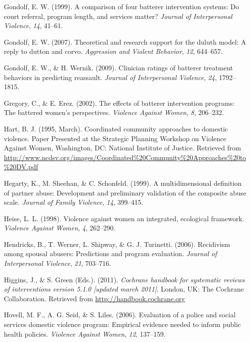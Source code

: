 \documentclass[11pt,]{tufte-book}
\begin{document}
\hypertarget{ref-gondolf1999comparison}{}
Gondolf, E. W. (1999). A comparison of four batterer intervention
systems: Do court referral, program length, and services matter?
\emph{Journal of Interpersonal Violence}, \emph{14}, 41--61.

\hypertarget{ref-gondolf2007theoretical}{}
Gondolf, E. W. (2007). Theoretical and research support for the duluth
model: A reply to dutton and corvo. \emph{Aggression and Violent
Behavior}, \emph{12}, 644--657.

\hypertarget{ref-gondolf2009clinician}{}
Gondolf, E. W., \& H. Wernik. (2009). Clinician ratings of batterer
treatment behaviors in predicting reassault. \emph{Journal of
Interpersonal Violence}, \emph{24}, 1792--1815.

\hypertarget{ref-gregory2002effects}{}
Gregory, C., \& E. Erez. (2002). The effects of batterer intervention
programs: The battered women's perspectives. \emph{Violence Against
Women}, \emph{8}, 206--232.

\hypertarget{ref-hart1995coordinated}{}
Hart, B. J. (1995, March). Coordinated community approaches to domestic
violence. Paper Presented at the Strategic Planning Workshop on Violence
Against Women, Washington, DC: National Institute of Justice. Retrieved
from
\url{http://www.ncdsv.org/images/Coordinated\%20Community\%20Approaches\%20to\%20DV.pdf}

\hypertarget{ref-hegarty1999multidimensional}{}
Hegarty, K., M. Sheehan, \& C. Schonfeld. (1999). A multidimensional
definition of partner abuse: Development and preliminary validation of
the composite abuse scale. \emph{Journal of Family Violence}, \emph{14},
399--415.

\hypertarget{ref-heise1998violence}{}
Heise, L. L. (1998). Violence against women an integrated, ecological
framework. \emph{Violence Against Women}, \emph{4}, 262--290.

\hypertarget{ref-hendricks2006recidivism}{}
Hendricks, B., T. Werner, L. Shipway, \& G. J. Turinetti. (2006).
Recidivism among spousal abusers: Predictions and program evaluation.
\emph{Journal of Interpersonal Violence}, \emph{21}, 703--716.

\hypertarget{ref-higgins2011cochrane}{}
Higgins, J., \& S. Green (Eds.). (2011). \emph{Cochrane handbook for
systematic reviews of interventions version 5.1.0 {[}updated march
2011{]}}. London, UK: The Cochrane Collaboration. Retrieved from
\url{http://handbook.cochrane.org}

\hypertarget{ref-hovell2006evaluation}{}
Hovell, M. F., A. G. Seid, \& S. Liles. (2006). Evaluation of a police
and social services domestic violence program: Empirical evidence needed
to inform public health policies. \emph{Violence Against Women},
\emph{12}, 137--159.
\end{document}
